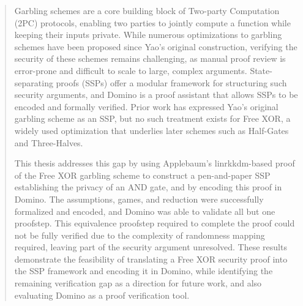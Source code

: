 \pagestyle{empty}
\begin{abstract}
\noindent 
Garbling schemes are a core building block of Two-party Computation (2PC) protocols, enabling two parties to jointly compute a function while keeping their inputs private. While numerous optimizations to garbling schemes have been proposed since Yao's original construction, verifying the security of these schemes remains challenging, as manual proof review is error-prone and difficult to scale to large, complex arguments. State-separating proofs (SSPs) offer a modular framework for structuring such security arguments, and Domino is a proof assistant that allows SSPs to be encoded and formally verified. Prior work has expressed Yao's original garbling scheme as an SSP, but no such treatment exists for Free XOR, a widely used optimization that underlies later schemes such as Half-Gates and Three-Halves.

This thesis addresses this gap by using Applebaum's \acrshort{linrkkdm}-based proof of the Free XOR garbling scheme to construct a pen-and-paper SSP establishing the privacy of an AND gate, and by encoding this proof in Domino. The assumptions, games, and reduction were successfully formalized and encoded, and Domino was able to validate all but one proofstep. This equivalence proofstep required to complete the proof could not be fully verified due to the complexity of randomness mapping required, leaving part of the security argument unresolved. These results demonstrate the feasibility of translating a Free XOR security proof into the SSP framework and encoding it in Domino, while identifying the remaining verification gap as a direction for future work, and also evaluating Domino as a proof verification tool.
\end{abstract}
\cleardoublepage
\resetlanguage